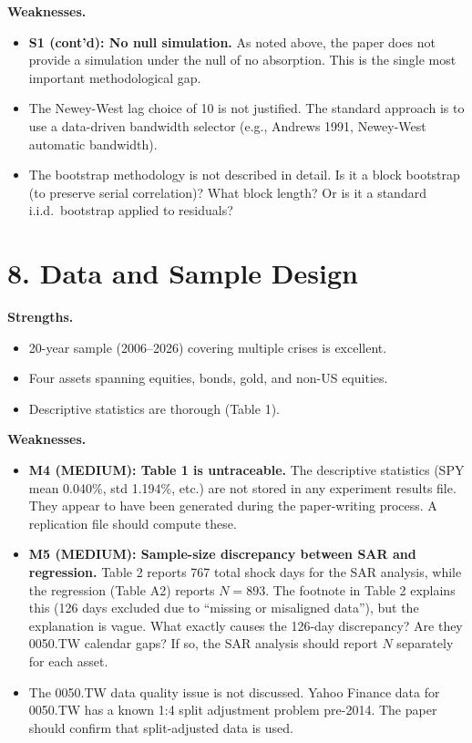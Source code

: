 \documentclass[12pt,a4paper]{article}
\begin{document}
\textbf{Weaknesses.}
\begin{itemize}[nosep]
  \item \textcolor{errorred}{\textbf{S1 (cont'd): No null simulation.}}  As noted above, the paper does not provide a simulation under the null of no absorption.  This is the single most important methodological gap.
  \item The Newey-West lag choice of 10 is not justified.  The standard approach is to use a data-driven bandwidth selector (e.g., Andrews 1991, Newey-West automatic bandwidth).
  \item The bootstrap methodology is not described in detail.  Is it a block bootstrap (to preserve serial correlation)?  What block length?  Or is it a standard i.i.d.\ bootstrap applied to residuals?
\end{itemize}

\section*{8. Data and Sample Design}

\textbf{Strengths.}
\begin{itemize}[nosep]
  \item 20-year sample (2006--2026) covering multiple crises is excellent.
  \item Four assets spanning equities, bonds, gold, and non-US equities.
  \item Descriptive statistics are thorough (Table 1).
\end{itemize}

\textbf{Weaknesses.}
\begin{itemize}[nosep]
  \item \textcolor{warncolor}{\textbf{M4 (MEDIUM): Table 1 is untraceable.}}  The descriptive statistics (SPY mean 0.040\%, std 1.194\%, etc.) are not stored in any experiment results file.  They appear to have been generated during the paper-writing process.  A replication file should compute these.
  \item \textcolor{warncolor}{\textbf{M5 (MEDIUM): Sample-size discrepancy between SAR and regression.}}  Table 2 reports 767 total shock days for the SAR analysis, while the regression (Table A2) reports $N = 893$.  The footnote in Table 2 explains this (126 days excluded due to ``missing or misaligned data''), but the explanation is vague.  What exactly causes the 126-day discrepancy?  Are they 0050.TW calendar gaps?  If so, the SAR analysis should report $N$ separately for each asset.
  \item The 0050.TW data quality issue is not discussed.  Yahoo Finance data for 0050.TW has a known 1:4 split adjustment problem pre-2014.  The paper should confirm that split-adjusted data is used.
\end{itemize}
\end{document}

